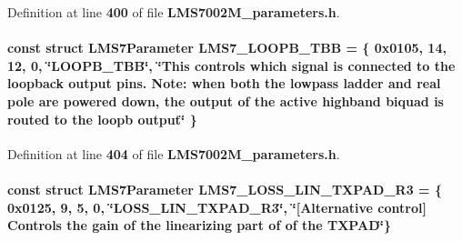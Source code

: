 Definition at line {\bf 400} of file {\bf L\+M\+S7002\+M\+\_\+parameters.\+h}.

\paragraph[{L\+M\+S7\+\_\+\+L\+O\+O\+P\+B\+\_\+\+T\+BB}]{\setlength{\rightskip}{0pt plus 5cm}const struct {\bf L\+M\+S7\+Parameter} L\+M\+S7\+\_\+\+L\+O\+O\+P\+B\+\_\+\+T\+BB = \{ 0x0105, 14, 12, 0, \char`\"{}\+L\+O\+O\+P\+B\+\_\+\+T\+B\+B\char`\"{}, \char`\"{}\+This controls which signal is connected to the loopback output pins. Note\+: when both the lowpass ladder and real pole are powered down, the output of the active highband biquad is routed to the loopb output\char`\"{} \}\hspace{0.3cm}{\ttfamily [static]}}\label{LMS7002M__parameters_8h_a01c6ec1b31c5b12215ab6f27e6d62185}


Definition at line {\bf 404} of file {\bf L\+M\+S7002\+M\+\_\+parameters.\+h}.

\paragraph[{L\+M\+S7\+\_\+\+L\+O\+S\+S\+\_\+\+L\+I\+N\+\_\+\+T\+X\+P\+A\+D\+\_\+\+R3}]{\setlength{\rightskip}{0pt plus 5cm}const struct {\bf L\+M\+S7\+Parameter} L\+M\+S7\+\_\+\+L\+O\+S\+S\+\_\+\+L\+I\+N\+\_\+\+T\+X\+P\+A\+D\+\_\+\+R3 = \{ 0x0125, 9, 5, 0, \char`\"{}\+L\+O\+S\+S\+\_\+\+L\+I\+N\+\_\+\+T\+X\+P\+A\+D\+\_\+\+R3\char`\"{}, \char`\"{}[\+Alternative control] Controls the gain of the linearizing part of of the T\+X\+P\+A\+D\char`\"{}\}\hspace{0.3cm}{\ttfamily [static]}}\label{LMS7002M__parameters_8h_ac59a41c1918bd03685a2c2ee25e40e96}


